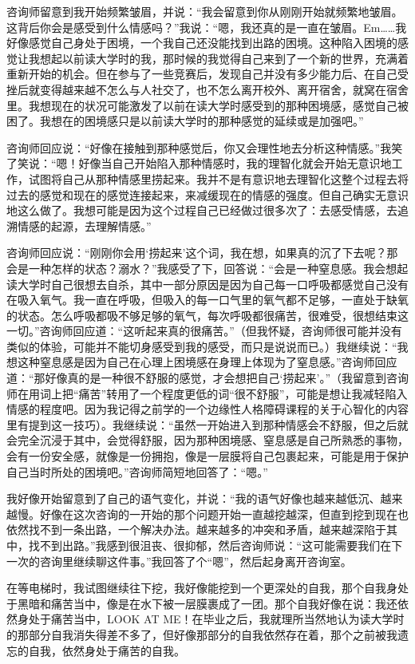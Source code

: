 咨询师留意到我开始频繁皱眉，并说：“我会留意到你从刚刚开始就频繁地皱眉。这背后你会是感受到什么情感吗？”我说：“嗯，我还真的是一直在皱眉。Em……我好像感觉自己身处于困境，一个我自己还没能找到出路的困境。这种陷入困境的感觉让我想起以前读大学时的我，那时候的我觉得自己来到了一个新的世界，充满着重新开始的机会。但在参与了一些竞赛后，发现自己并没有多少能力后、在自己受挫后就变得越来越不怎么与人社交了，也不怎么离开校外、离开宿舍，就窝在宿舍里。我想现在的状况可能激发了以前在读大学时感受到的那种困境感，感觉自己被困了。我想在的困境感只是以前读大学时的那种感觉的延续或是加强吧。”

咨询师回应说：“好像在接触到那种感觉后，你又会理性地去分析这种情感。”我笑了笑说：“嗯！好像当自己开始陷入那种情感时，我的理智化就会开始无意识地工作，试图将自己从那种情感里捞起来。我并不是有意识地去理智化这整个过程\pozhehao{}去将过去的感觉和现在的感觉连接起来，来减缓现在的情感的强度。但自己确实无意识地这么做了。我想可能是因为这个过程自己已经做过很多次了：去感受情感，去追溯情感的起源，去理解情感。”

咨询师回应说：“刚刚你会用‘捞起来’这个词，我在想，如果真的沉了下去呢？那会是一种怎样的状态？溺水？”我感受了下，回答说：“会是一种窒息感。我会想起读大学时自己很想去自杀，其中一部分原因是因为自己每一口呼吸都感觉自己没有在吸入氧气。我一直在呼吸，但吸入的每一口气里的氧气都不足够，一直处于缺氧的状态。怎么呼吸都吸不够足够的氧气，每次呼吸都很痛苦，很难受，很想结束这一切。”咨询师回应道：“这听起来真的很痛苦。”（但我怀疑，咨询师很可能并没有类似的体验，可能并不能切身感受到我的感受，而只是说说而已。）我继续说：“我想这种窒息感是因为自己在心理上困境感在身理上体现为了窒息感。”咨询师回应道：“那好像真的是一种很不舒服的感觉，才会想把自己‘捞起来’。”（我留意到咨询师在用词上把“痛苦”转用了一个程度更低的词“很不舒服”，可能是想让我减轻陷入情感的程度吧。因为我记得之前学的一个边缘性人格障碍课程的关于心智化的内容里有提到这一技巧）。我继续说：“虽然一开始进入到那种情感会不舒服，但之后就会完全沉浸于其中，会觉得舒服，因为那种困境感、窒息感是自己所熟悉的事物，会有一份安全感，就像是一份拥抱，像是一层膜将自己包裹起来，可能是用于保护自己当时所处的困境吧。”咨询师简短地回答了：“嗯。”

我好像开始留意到了自己的语气变化，并说：“我的语气好像也越来越低沉、越来越慢。好像在这次咨询的一开始的那个问题开始一直越挖越深，但直到挖到现在也依然找不到一条出路，一个解决办法。越来越多的冲突和矛盾，越来越深陷于其中，找不到出路。”我感到很沮丧、很抑郁，然后咨询师说：“这可能需要我们在下一次的咨询里继续聊这件事。”我回答了个“嗯”，然后起身离开咨询室。

在等电梯时，我试图继续往下挖，我好像能挖到一个更深处的自我，那个自我身处于黑暗和痛苦当中，像是在水下被一层膜裹成了一团。那个自我好像在说：我还依然身处于痛苦当中，LOOK AT ME！在毕业之后，我就理所当然地认为读大学时的那部分自我消失得差不多了，但好像那部分的自我依然存在着，那个之前被我遗忘的自我，依然身处于痛苦的自我。


